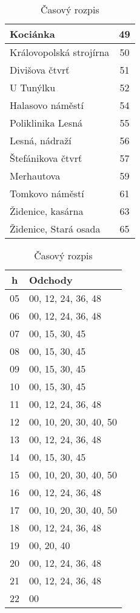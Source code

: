 \begin{table}[h]
\begin{minipage}{0.35\textwidth}
\begin{tabular}{|l|c|}
      Kociánka & 49 \\ \hline
      Královopolská strojírna & 50 \\ \hline
      Divišova čtvrť & 51 \\ \hline
      U Tunýlku & 52 \\ \hline
      Halasovo náměstí & 54 \\ \hline
      Poliklinika Lesná & 55 \\ \hline
      Lesná, nádraží & 56 \\ \hline
      Štefánikova čtvrť & 57 \\ \hline
      Merhautova & 59 \\ \hline
      Tomkovo náměstí & 61 \\ \hline
      Židenice, kasárna & 63 \\ \hline
      Židenice, Stará osada & 65 \\ \hline
    \end{tabular}
    \caption{Rozpis zastávok}      
  \end{minipage}
  \begin{minipage}{0.55\textwidth}
    \centering
    \begin{tabular}{|c|l|}
      \hline
        \textbf{h} & \textbf{Odchody} \\ \hline
        05 & 00, 12, 24, 36, 48 \\ \hline
        06 & 00, 12, 24, 36, 48 \\ \hline
        07 & 00, 15, 30, 45 \\ \hline
        08 & 00, 15, 30, 45 \\ \hline
        09 & 00, 15, 30, 45 \\ \hline
        10 & 00, 15, 30, 45 \\ \hline
        11 & 00, 12, 24, 36, 48 \\ \hline
        12 & 00, 10, 20, 30, 40, 50 \\ \hline
        13 & 00, 12, 24, 36, 48 \\ \hline
        14 & 00, 15, 30, 45 \\ \hline
        15 & 00, 10, 20, 30, 40, 50 \\ \hline
        16 & 00, 12, 24, 36, 48 \\ \hline
        17 & 00, 10, 20, 30, 40, 50 \\ \hline
        18 & 00, 12, 24, 36, 48 \\ \hline
        19 & 00, 20, 40 \\ \hline
        20 & 00, 12, 24, 36, 48 \\ \hline
        21 & 00, 12, 24, 36, 48 \\ \hline
        22 & 00 \\ \hline
    \end{tabular}
    \caption{Časový rozpis}
  \end{minipage}
\end{table}
